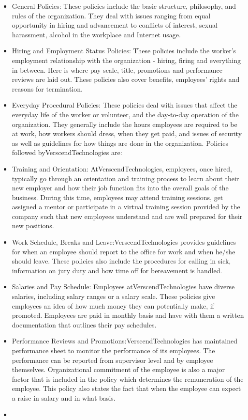 \begin{itemize}
\item
General Policies: These policies include the basic structure, philosophy, and rules of the organization.
They deal with issues ranging from equal opportunity in hiring and advancement to conflicts of
interest, sexual harassment, alcohol in the workplace and Internet usage.
\item
Hiring and Employment Status Policies: These policies include the worker's employment
relationship with the organization - hiring, firing and everything in between. Here is where pay scale,
title, promotions and performance reviews are laid out. These policies also cover benefits, employees'
rights and reasons for termination.
\item
Everyday Procedural Policies: These policies deal with issues that affect the everyday life of the
worker or volunteer, and the day-to-day operation of the organization. They generally include the
hours employees are required to be at work, how workers should dress, when they get paid, and issues
of security as well as guidelines for how things are done in the organization.
Policies followed byVerscendTechnologies are:
\item
Training and Orientation: AtVerscendTechnologies, employees, once hired, typically go
through an orientation and training process to learn about their new employer and how their job
function fits into the overall goals of the business. During this time, employees may attend training
sessions, get assigned a mentor or participate in a virtual training session provided by the company
such that new employees understand and are well prepared for their new positions.
\item
Work Schedule, Breaks and Leave:VerscendTechnologies provides guidelines for when
an employee should report to the office for work and when he/she should leave. These policies also
include the procedures for calling in sick, information on jury duty and how time off for bereavement
is handled.
\item
Salaries and Pay Schedule: Employees atVerscendTechnologies have diverse salaries,
including salary ranges or a salary scale. These policies give employees an idea of how much money
they can potentially make, if promoted. Employees are paid in monthly basis and have with them
a
written documentation that outlines their pay schedules.
\item
Performance Reviews and Promotions:VerscendTechnologies has maintained
performance sheet to monitor the performance of its employees. The performance can be reported from
supervisor level and by employee themselves. Organizational commitment of the employee is also a
major factor that is included in the policy which determines the remuneration of the employee. This
policy also states the fact that when the employee can expect a raise in salary and in what basis.
\item
\end{itemize}
